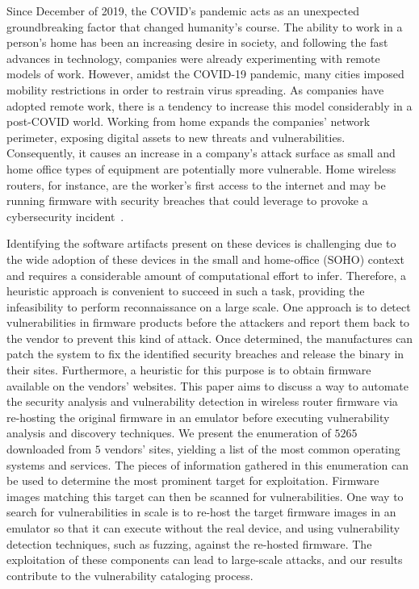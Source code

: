 \documentclass[12pt]{article}
\begin{document}
Since December of 2019, the COVID's pandemic acts as an unexpected groundbreaking factor that changed humanity's course.  The ability to work in a person's home has been an increasing desire in society, and following the fast advances in technology, companies were already experimenting with remote models of work. However, amidst the COVID-19 pandemic, many cities imposed mobility restrictions in order to restrain virus spreading.  As companies have adopted remote work, there is a tendency to increase this model considerably in a post-COVID world.  Working from home expands the companies' network perimeter, exposing digital assets to new threats and vulnerabilities. Consequently, it causes an increase in a company's attack surface as small and home office types of equipment are potentially more vulnerable. Home wireless routers, for instance, are the worker's first access to the internet and may be running firmware with security breaches that could leverage to provoke a cybersecurity incident~\cite{soho}.

Identifying the software artifacts present on these devices is challenging due to the wide adoption of these devices in the small and home-office (SOHO) context and requires a considerable amount of computational effort to infer. Therefore, a heuristic approach is convenient to succeed in such a task, providing the infeasibility to perform reconnaissance on a large scale. One approach is to detect vulnerabilities in firmware products before the attackers and report them back to the vendor to prevent this kind of attack. Once determined, the manufactures can patch the system to fix the identified security breaches and release the binary in their sites.  Furthermore, a heuristic for this purpose is to obtain firmware available on the vendors' websites.  
% 
This paper aims to discuss a way to automate the security analysis and vulnerability detection in wireless router firmware via re-hosting the original firmware in an emulator before executing vulnerability analysis and discovery techniques.  We present the enumeration of $5265$ downloaded from $5$ vendors' sites, yielding a list of the most common operating systems and services. The pieces of information gathered in this enumeration can be used to determine the most prominent target for exploitation. Firmware images matching this target can then be scanned for vulnerabilities. One way to search for vulnerabilities in scale is to re-host the target firmware images in an emulator so that it can execute without the real device, and using vulnerability detection techniques, such as fuzzing, against the re-hosted firmware. The exploitation of these components can lead to large-scale attacks, and our results contribute to the vulnerability cataloging process.
\end{document}
